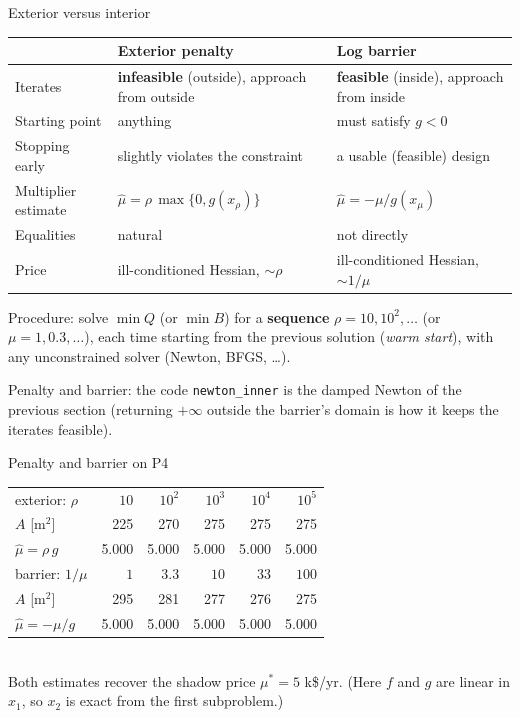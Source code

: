 \begin{frame}{Exterior versus interior}
  \centering\small
  \begin{tabular}{p{3.2cm}p{5.2cm}p{5.2cm}}
    \toprule
    & \textbf{Exterior penalty} & \textbf{Log barrier}\\
    \midrule
    Iterates & \textbf{infeasible} (outside), approach from outside & \textbf{feasible} (inside), approach from inside\\
    Starting point & anything & must satisfy $g<0$\\
    Stopping early & slightly violates the constraint & a usable (feasible) design\\
    Multiplier estimate & $\hat\mu=\rho\,\max\{0,g(x_\rho)\}$ & $\hat\mu=-\mu/g(x_\mu)$\\
    Equalities & natural & not directly\\
    Price & ill-conditioned Hessian, $\sim\rho$ & ill-conditioned Hessian, $\sim1/\mu$\\
    \bottomrule
  \end{tabular}
  \vspace{0.3cm}

  \normalsize Procedure: solve $\min Q$ (or $\min B$) for a \textbf{sequence} $\rho=10,10^2,\dots$ (or $\mu=1,0.3,\dots$), each time starting from the previous solution (\emph{warm start}), with any unconstrained solver (Newton, BFGS, \dots).
\end{frame}

\begin{frame}{Penalty and barrier: the code}
  \small \texttt{newton\_inner} is the damped Newton of the previous section (returning $+\infty$ outside the barrier's domain is how it keeps the iterates feasible).
\end{frame}

\begin{frame}{Penalty and barrier on P4}
  \centering
  \\[-2pt]
  \small
  \begin{tabular}{lrrrrr}
    \toprule
    exterior: $\rho$ & $10$ & $10^2$ & $10^3$ & $10^4$ & $10^5$\\
    $A$ [m$^2$] & 225 & 270 & 275 & 275 & 275\\
    $\hat\mu=\rho\,g$ & 5.000 & 5.000 & 5.000 & 5.000 & 5.000\\
    \midrule
    barrier: $1/\mu$ & $1$ & $3.3$ & $10$ & $33$ & $100$\\
    $A$ [m$^2$] & 295 & 281 & 277 & 276 & 275\\
    $\hat\mu=-\mu/g$ & 5.000 & 5.000 & 5.000 & 5.000 & 5.000\\
    \bottomrule
  \end{tabular}
  \\[2pt]\footnotesize Both estimates recover the shadow price $\mu^\ast=5$ k\$/yr. (Here $f$ and $g$ are linear in $x_1$, so $x_2$ is exact from the first subproblem.)
\end{frame}

